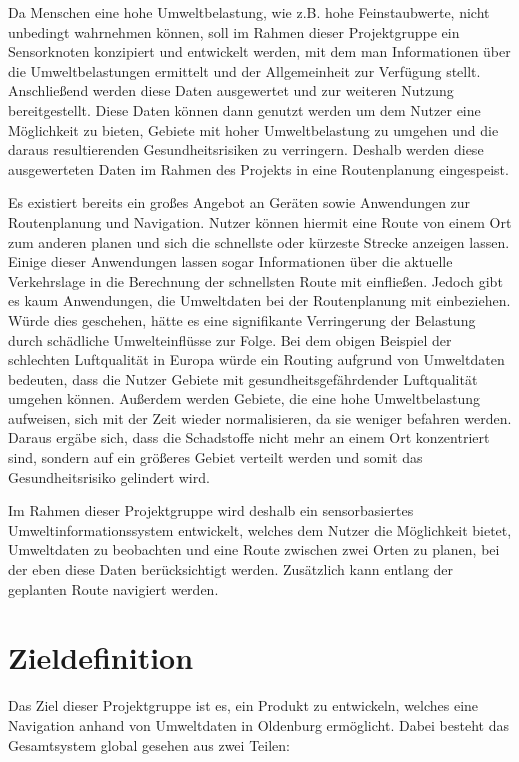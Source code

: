 Da Menschen eine hohe Umweltbelastung, wie z.B. hohe Feinstaubwerte, nicht unbedingt wahrnehmen können, soll im Rahmen dieser Projektgruppe ein Sensorknoten konzipiert und entwickelt werden, mit dem man Informationen über die Umweltbelastungen ermittelt und der Allgemeinheit zur Verfügung stellt. Anschließend werden diese Daten ausgewertet und zur weiteren Nutzung bereitgestellt. Diese Daten können dann genutzt werden um dem Nutzer eine Möglichkeit zu bieten, Gebiete mit hoher Umweltbelastung zu umgehen und die daraus resultierenden Gesundheitsrisiken zu verringern. Deshalb werden diese ausgewerteten Daten im Rahmen des Projekts in eine Routenplanung eingespeist.

Es existiert bereits ein großes Angebot an Geräten sowie Anwendungen zur Routenplanung und Navigation. Nutzer können hiermit eine Route von einem Ort zum anderen planen und sich die schnellste oder kürzeste Strecke anzeigen lassen. Einige dieser Anwendungen lassen sogar Informationen über die aktuelle Verkehrslage in die Berechnung der schnellsten Route mit einfließen. Jedoch gibt es kaum Anwendungen, die Umweltdaten bei der Routenplanung mit einbeziehen. Würde dies geschehen, hätte es eine signifikante Verringerung der Belastung durch schädliche Umwelteinflüsse zur Folge. Bei dem obigen Beispiel der schlechten Luftqualität in Europa würde ein Routing aufgrund von Umweltdaten bedeuten, dass die Nutzer Gebiete mit gesundheitsgefährdender Luftqualität umgehen können. Außerdem werden Gebiete, die eine hohe Umweltbelastung aufweisen, sich mit der Zeit wieder normalisieren, da sie weniger befahren werden. Daraus ergäbe sich, dass die Schadstoffe nicht mehr an einem Ort konzentriert sind, sondern auf ein größeres Gebiet verteilt werden und somit das Gesundheitsrisiko gelindert wird.

Im Rahmen dieser Projektgruppe wird deshalb ein sensorbasiertes Umweltinformationssystem entwickelt, welches dem Nutzer die Möglichkeit bietet, Umweltdaten zu beobachten und eine Route zwischen zwei Orten zu planen, bei der eben diese Daten berücksichtigt werden. Zusätzlich kann entlang der geplanten Route navigiert werden.

\section{Zieldefinition}
\label{sec:Zieldefinition}
Das Ziel dieser Projektgruppe ist es, ein Produkt zu entwickeln, welches eine Navigation anhand von Umweltdaten in Oldenburg ermöglicht. Dabei besteht das Gesamtsystem global gesehen aus zwei Teilen:

